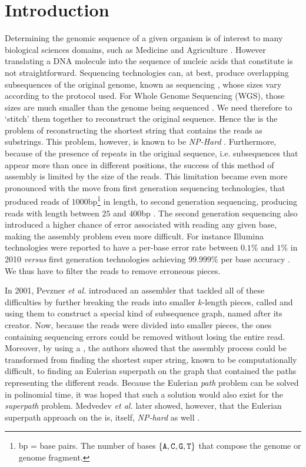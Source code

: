 \chapter{Introduction}

Determining the genomic sequence of a given organism is of interest to many biological sciences domains, such as Medicine and Agriculture \cite{Lohmann2014, Imelfort2009}. However translating a DNA molecule into the sequence of nucleic acids that constitute is not straightforward. Sequencing technologies can, at best, produce overlapping subsequences of the original genome, known as sequencing , whose sizes vary according to the protocol used. For Whole Genome Sequencing (WGS), those sizes are much smaller than the genome being sequenced \cite{Miller2010}. We need therefore to `stitch' them together to reconstruct the original sequence. Hence the  is the problem of reconstructing the shortest string that contains the reads as substrings. This problem, however, is known to be \emph{NP-Hard} \cite{Gallant1980}. Furthermore, because of the presence of repeats in the original sequence, i.e. subsequences that appear more than once in different positions, the success of this method of assembly is limited by the size of the reads. This limitation became even more pronounced with the move from first generation sequencing technologies, that produced reads of $1000$bp\footnote{bp = base pairs. The number of bases $\{\mathtt{A}, \mathtt{C}, \mathtt{G}, \mathtt{T}\}$ that compose the genome or genome fragment.} in length, to second generation sequencing, producing reads with length between $25$ and $400$bp \cite{Shendure2008}. The second generation sequencing also introduced a higher chance of error associated with reading any given base, making the assembly problem even more difficult. For instance Illumina technologies were reported to have a per-base error rate between $0.1\%$ and $1\%$ in 2010 \cite{Metzker2010} \emph{versus} first generation technologies achieving $99.999\%$ per base accuracy \cite{Shendure2008}. We thus have to filter the reads to remove erroneous pieces.

In 2001, Pevzner \emph{et al.} \cite{Pevzner2001} introduced an assembler that tackled all of these difficulties by further breaking the reads into smaller $k$-length pieces, called  and using them to construct a special kind of subsequence graph, named \keyterm{\dBG} after its creator. Now, because the reads were divided into smaller pieces, the ones containing sequencing errors could be removed without losing the entire read. Moreover, by using a \dBG, the authors showed that the assembly process could be transformed from finding the shortest super string, known to be computationally difficult, to finding an Eulerian superpath on the graph that contained the paths representing the different reads. Because the Eulerian \emph{path} problem can be solved in polinomial time, it was hoped that such a solution would also exist for the \emph{superpath} problem. Medvedev \emph{et al.} later showed, however, that the Eulerian superpath approach on the \dBG is, itself, \emph{NP-hard} as well \cite{Medvedev2007, Kapun2013}.

